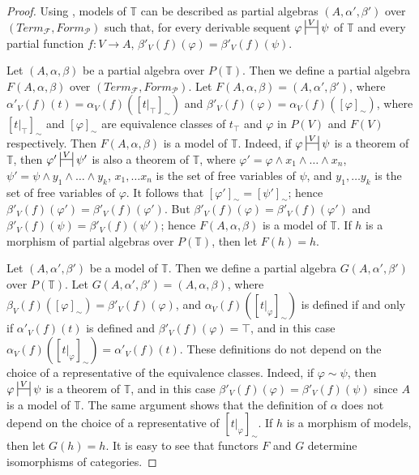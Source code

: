 \documentclass[reqno]{amsart}
\theoremstyle{definition}
\theoremstyle{remark}
\numberwithin{figure}{section}
\begin{document}
\begin{proof}
Using , models of $\mathbb{T}$ can be described as partial algebras $(A,\alpha',\beta')$ over $(Term_\mathcal{F},Form_\mathcal{P})$
    such that, for every derivable sequent $\varphi \ssststile{}{V} \psi$ of $\mathbb{T}$ and every partial function $f : V \to A$, $\beta'_V(f)(\varphi) = \beta'_V(f)(\psi)$.

Let $(A,\alpha,\beta)$ be a partial algebra over $P(\mathbb{T})$.
Then we define a partial algebra $F(A,\alpha,\beta)$ over $(Term_\mathcal{F},Form_\mathcal{P})$.
Let $F(A,\alpha,\beta) = (A,\alpha',\beta')$, where $\alpha'_V(f)(t) = \alpha_V(f)([t|_\top]_\sim)$ and $\beta'_V(f)(\varphi) = \alpha_V(f)([\varphi]_\sim)$,
    where $[t|_\top]_\sim$ and $[\varphi]_\sim$ are equivalence classes of $t_\top$ and $\varphi$ in $P(V)$ and $F(V)$ respectively.
Then $F(A,\alpha,\beta)$ is a model of $\mathbb{T}$.
Indeed, if $\varphi \ssststile{}{V} \psi$ is a theorem of $\mathbb{T}$, then $\varphi' \ssststile{}{V} \psi'$
    is also a theorem of $\mathbb{T}$, where $\varphi' = \varphi \land x_1 \land \ldots \land x_n$, $\psi' = \psi \land y_1 \land \ldots \land y_k$,
    $x_1, \ldots x_n$ is the set of free variables of $\psi$, and $y_1, \ldots y_k$ is the set of free variables of $\varphi$.
It follows that $[\varphi']_\sim = [\psi']_\sim$; hence $\beta'_V(f)(\varphi') = \beta'_V(f)(\varphi')$.
But $\beta'_V(f)(\varphi) = \beta'_V(f)(\varphi')$ and $\beta'_V(f)(\psi) = \beta'_V(f)(\psi')$; hence $F(A,\alpha,\beta)$ is a model of $\mathbb{T}$.
If $h$ is a morphism of partial algebras over $P(\mathbb{T})$, then let $F(h) = h$.

Let $(A,\alpha',\beta')$ be a model of $\mathbb{T}$.
Then we define a partial algebra $G(A,\alpha',\beta')$ over $P(\mathbb{T})$.
Let $G(A,\alpha',\beta') = (A,\alpha,\beta)$, where $\beta_V(f)([\varphi]_\sim) = \beta'_V(f)(\varphi)$, and $\alpha_V(f)([t|_\varphi]_\sim)$ is defined
    if and only if $\alpha'_V(f)(t)$ is defined and $\beta'_V(f)(\varphi) = \top$, and in this case $\alpha_V(f)([t|_\varphi]_\sim) = \alpha'_V(f)(t)$.
These definitions do not depend on the choice of a representative of the equivalence classes.
Indeed, if $\varphi \sim \psi$, then $\varphi \ssststile{}{V} \psi$ is a theorem of $\mathbb{T}$,
    and in this case $\beta'_V(f)(\varphi) = \beta'_V(f)(\psi)$ since $A$ is a model of $\mathbb{T}$.
The same argument shows that the definition of $\alpha$ does not depend on the choice of a representative of $[t|_\varphi]_\sim$.
If $h$ is a morphism of models, then let $G(h) = h$.
It is easy to see that functors $F$ and $G$ determine isomorphisms of categories.
\end{proof}
\end{document}
